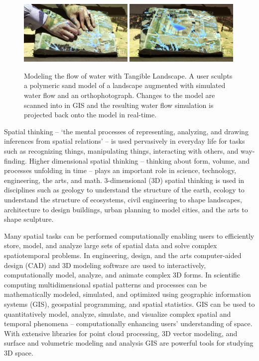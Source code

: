 \documentclass[prodmode,acmtochi]{acmsmall} %
\begin{document}
\begin{figure}
\begin{center}
		\includegraphics[width=0.49\textwidth]{images/applications/tl_sequence_2.jpg}
		\includegraphics[width=0.49\textwidth]{images/applications/tl_sequence_3.jpg}
	\caption{Modeling the flow of water with Tangible Landscape. 
	A user sculpts a polymeric sand model of a landscape
	augmented with simulated water flow and an orthophotograph.  
	Changes to the model are scanned into in GIS 
	and the resulting water flow simulation is
	projected back onto the model in real-time.}
	\label{fig:tl_flow}
\end{center}
\end{figure}

Spatial thinking -- `the mental processes of representing, analyzing, and drawing inferences from spatial relations' \cite{Uttal2013} -- is used pervasively in everyday life for tasks such as recognizing things, manipulating things, interacting with others, and way-finding. 
% 
Higher dimensional spatial thinking 
-- thinking about form, volume, and processes unfolding in time -- 
plays an important role in 
science, technology, engineering, the arts, and math. 
%
3-dimensional (3D) spatial thinking is used in disciplines 
such as geology to understand the structure of the earth, 
ecology to understand the structure of ecosystems, 
civil engineering to shape landscapes, 
architecture to design buildings,
urban planning to model cities,
and the arts to shape sculpture.

Many spatial tasks can be performed computationally 
enabling users to efficiently store, model, and analyze large sets of spatial data 
and solve complex spatiotemporal problems.
%
In engineering, design, and the arts 
computer-aided design (CAD) and 3D modeling software are used 
to interactively, computationally model, analyze, and animate complex 3D forms.
%
In scientific computing
multidimensional spatial patterns and processes can be 
mathematically modeled, simulated, and optimized 
using geographic information systems (GIS), 
geospatial programming, and 
spatial statistics. 
%
GIS can be used to quantitatively model, analyze, simulate, and visualize 
complex spatial and temporal phenomena 
-- computationally enhancing users' understanding of space. 
%
With extensive libraries for point cloud processing, 
3D vector modeling, and
surface and volumetric modeling and analysis
GIS are powerful tools for studying 3D space.
\end{document}
